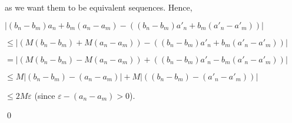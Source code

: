 \documentclass{article}
\theoremstyle{remark}
\begin{document}
\begin{enumerate}
\begin{center}
        \end{center}
        as we want them to be equivalent sequences.
        Hence,
        \begin{center}
            $\displaystyle \vert (b_n-b_m)a_n + b_m(a_n-a_m) - ((b_n-b_m)a'_n + b_m(a'_n-a'_m))\vert$
        \end{center}
        \begin{center}
            $\displaystyle \leq \vert (M(b_n-b_m) + M(a_n-a_m)) - ((b_n-b_m)a'_n + b_m(a'_n-a'_m))\vert$
        \end{center}
        \begin{center}
            $\displaystyle = \vert (M(b_n-b_m) - M(a_n-a_m)) + ((b_n-b_m)a'_n - b_m(a'_n-a'_m)) \vert $  
        \end{center}
        \begin{center}
            $\displaystyle \leq M\vert (b_n-b_m) - (a_n-a_m)\vert + M\vert ((b_n-b_m) - (a'_n-a'_m)) \vert$  
        \end{center}
        \begin{center}
            $\displaystyle \leq 2M\varepsilon$ (since $\varepsilon - (a_n-a_m) > 0$).
        \end{center}
        \begin{flushright}
            \qed
        \end{flushright}


\end{enumerate}
\end{document}
